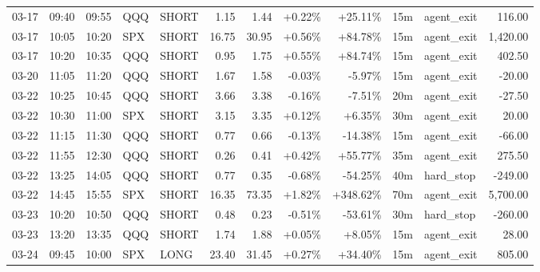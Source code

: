 \documentclass[11pt,a4paper]{article}
\begin{document}
\begin{center}
\begin{longtable}{>{\color{txtmain}}l l l l l r r r r r >{\color{txtmain}}l r}
03-17 & 09:40 & 09:55 & QQQ & SHORT & 1.15 & 1.44 & \textcolor{wingreen}{+0.22\%} & \textcolor{wingreen}{+25.11\%} & 15m & agent\_exit & \textcolor{wingreen}{116.00} \\
03-17 & 10:05 & 10:20 & SPX & SHORT & 16.75 & 30.95 & \textcolor{wingreen}{+0.56\%} & \textcolor{wingreen}{+84.78\%} & 15m & agent\_exit & \textcolor{wingreen}{1,420.00} \\
03-17 & 10:20 & 10:35 & QQQ & SHORT & 0.95 & 1.75 & \textcolor{wingreen}{+0.55\%} & \textcolor{wingreen}{+84.74\%} & 15m & agent\_exit & \textcolor{wingreen}{402.50} \\
03-20 & 11:05 & 11:20 & QQQ & SHORT & 1.67 & 1.58 & \textcolor{lossred}{-0.03\%} & \textcolor{lossred}{-5.97\%} & 15m & agent\_exit & \textcolor{lossred}{-20.00} \\
03-22 & 10:25 & 10:45 & QQQ & SHORT & 3.66 & 3.38 & \textcolor{lossred}{-0.16\%} & \textcolor{lossred}{-7.51\%} & 20m & agent\_exit & \textcolor{lossred}{-27.50} \\
03-22 & 10:30 & 11:00 & SPX & SHORT & 3.15 & 3.35 & \textcolor{wingreen}{+0.12\%} & \textcolor{wingreen}{+6.35\%} & 30m & agent\_exit & \textcolor{wingreen}{20.00} \\
03-22 & 11:15 & 11:30 & QQQ & SHORT & 0.77 & 0.66 & \textcolor{lossred}{-0.13\%} & \textcolor{lossred}{-14.38\%} & 15m & agent\_exit & \textcolor{lossred}{-66.00} \\
03-22 & 11:55 & 12:30 & QQQ & SHORT & 0.26 & 0.41 & \textcolor{wingreen}{+0.42\%} & \textcolor{wingreen}{+55.77\%} & 35m & agent\_exit & \textcolor{wingreen}{275.50} \\
03-22 & 13:25 & 14:05 & QQQ & SHORT & 0.77 & 0.35 & \textcolor{lossred}{-0.68\%} & \textcolor{lossred}{-54.25\%} & 40m & hard\_stop & \textcolor{lossred}{-249.00} \\
03-22 & 14:45 & 15:55 & SPX & SHORT & 16.35 & 73.35 & \textcolor{wingreen}{+1.82\%} & \textcolor{wingreen}{+348.62\%} & 70m & agent\_exit & \textcolor{wingreen}{5,700.00} \\
03-23 & 10:20 & 10:50 & QQQ & SHORT & 0.48 & 0.23 & \textcolor{lossred}{-0.51\%} & \textcolor{lossred}{-53.61\%} & 30m & hard\_stop & \textcolor{lossred}{-260.00} \\
03-23 & 13:20 & 13:35 & QQQ & SHORT & 1.74 & 1.88 & \textcolor{wingreen}{+0.05\%} & \textcolor{wingreen}{+8.05\%} & 15m & agent\_exit & \textcolor{wingreen}{28.00} \\
03-24 & 09:45 & 10:00 & SPX & LONG & 23.40 & 31.45 & \textcolor{wingreen}{+0.27\%} & \textcolor{wingreen}{+34.40\%} & 15m & agent\_exit & \textcolor{wingreen}{805.00} \\

\end{longtable}
\end{center}
\end{document}
